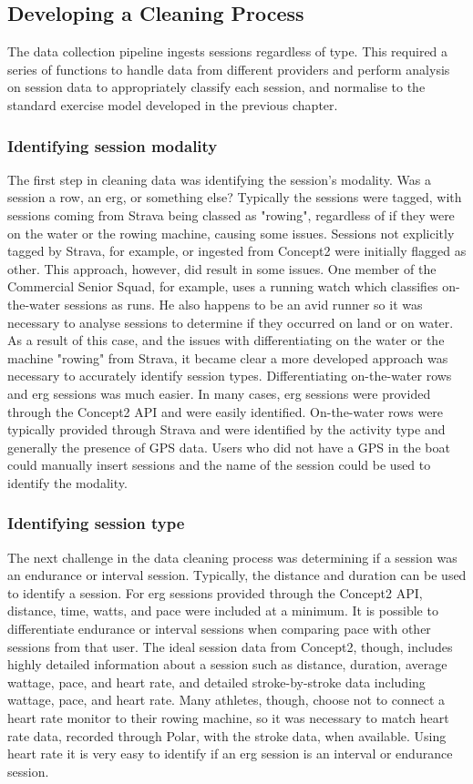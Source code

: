 \subsection{Developing a Cleaning Process}
The data collection pipeline ingests sessions regardless of type. This required a series of functions to handle data from different providers and perform analysis on session data to appropriately classify each session, and normalise to the standard exercise model developed in the previous chapter.

\subsubsection{Identifying session modality}
The first step in cleaning data was identifying the session's modality. Was a session a row, an erg, or something else? Typically the sessions were tagged, with sessions coming from Strava being classed as "rowing", regardless of if they were on the water or the rowing machine, causing some issues. Sessions not explicitly tagged by Strava, for example, or ingested from Concept2 were initially flagged as other. This approach, however, did result in some issues. One member of the Commercial Senior Squad, for example, uses a running watch which classifies on-the-water sessions as runs. He also happens to be an avid runner so it was necessary to analyse sessions to determine if they occurred on land or on water. As a result of this case, and the issues with differentiating on the water or the machine "rowing" from Strava, it became clear a more developed approach was necessary to accurately identify session types. Differentiating on-the-water rows and erg sessions was much easier. In many cases, erg sessions were provided through the Concept2 API and were easily identified. On-the-water rows were typically provided through Strava and were identified by the activity type and generally the presence of GPS data. Users who did not have a GPS in the boat could manually insert sessions and the name of the session could be used to identify the modality.


\subsubsection{Identifying session type}
The next challenge in the data cleaning process was determining if a session was an endurance or interval session. Typically, the distance and duration can be used to identify a session. For erg sessions provided through the Concept2 API, distance, time, watts, and pace were included at a minimum. It is possible to differentiate endurance or interval sessions when comparing pace with other sessions from that user. The ideal session data from Concept2, though, includes highly detailed information about a session such as distance, duration, average wattage, pace, and heart rate, and detailed stroke-by-stroke data including wattage, pace, and heart rate. Many athletes, though, choose not to connect a heart rate monitor to their rowing machine, so it was necessary to match heart rate data, recorded through Polar, with the stroke data, when available. Using heart rate it is very easy to identify if an erg session is an interval or endurance session.

